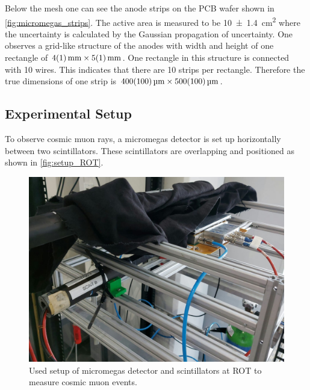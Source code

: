 \documentclass[sn-mathphys-num,iicol]{sn-jnl}
\theoremstyle{thmstyleone}
\theoremstyle{thmstyletwo}
\theoremstyle{thmstylethree}
\begin{document}
Below the mesh one can see the anode strips on the PCB wafer shown in \autoref{fig:micromegas_strips}.
The active area is measured to be \SI{10\pm1.4}{\cm^2} where the uncertainty is calculated by the Gaussian propagation of uncertainty.
One observes a grid-like structure of the anodes with width and height of one rectangle of $\SI{4\pm1}{\mm}\times\SI{5\pm1}{\mm}$.
One rectangle in this structure is connected with 10 wires.
This indicates that there are 10 strips per rectangle.
Therefore the true dimensions of one strip is $\SI{400\pm100}{\micro\meter}\times\SI{500\pm100}{\micro\meter}$.


\subsection{Experimental Setup}
To observe cosmic muon rays, a micromegas detector is set up horizontally between two scintillators.
These scintillators are overlapping and positioned as shown in \autoref{fig:setup_ROT}.

\begin{figure}
  \includegraphics[width=\linewidth]{figures/setup_ROT.jpeg}
  \caption{Used setup of micromegas detector and scintillators at ROT to measure cosmic muon events.}
  \label{fig:setup_ROT}
\end{figure}
\end{document}
